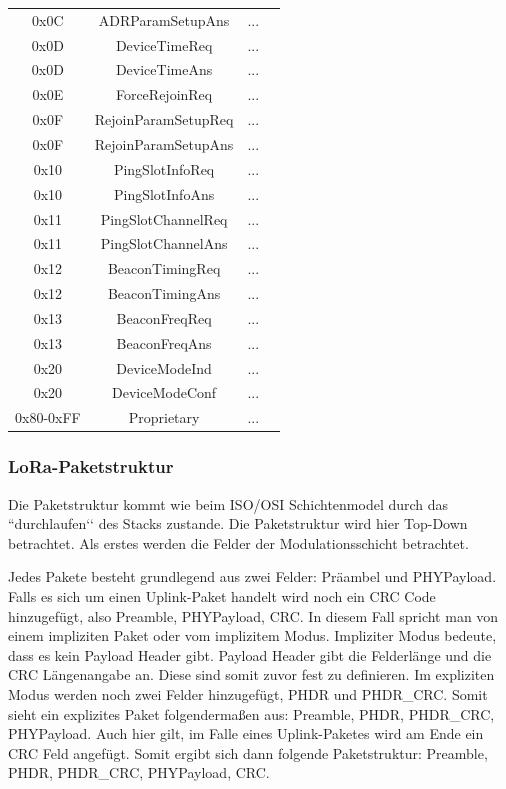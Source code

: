 \documentclass[a4paper, 12pt]{article}
\begin{document}
\begin{longtable}{c |c | p{10.5cm} c}
                    0x0C & ADRParamSetupAns & ... \\
                    0x0D & DeviceTimeReq & ... \\
                    0x0D & DeviceTimeAns & ... \\
                    0x0E & ForceRejoinReq & ... \\
                    0x0F & RejoinParamSetupReq & ... \\
                    0x0F & RejoinParamSetupAns & ... \\
                    0x10 & PingSlotInfoReq & ... \\
                    0x10 & PingSlotInfoAns & ... \\
                    0x11 & PingSlotChannelReq & ... \\
                    0x11 & PingSlotChannelAns & ... \\
                    0x12 & BeaconTimingReq & ... \\
                    0x12 & BeaconTimingAns & ... \\
                    0x13 & BeaconFreqReq & ... \\
                    0x13 & BeaconFreqAns & ... \\
                    0x20 & DeviceModeInd & ... \\
                    0x20 & DeviceModeConf & ... \\
                    0x80-0xFF & Proprietary & ... \\
                    
                    
                \end{longtable}
                


            \subsubsection{LoRa-Paketstruktur}
                Die Paketstruktur kommt wie beim ISO/OSI Schichtenmodel durch das ``durchlaufen‘‘ des Stacks zustande. 
                Die Paketstruktur wird hier Top-Down betrachtet. Als erstes werden die Felder
                der Modulationsschicht betrachtet.

                Jedes Pakete besteht grundlegend aus zwei Felder: Präambel und PHYPayload. Falls es sich um einen 
                Uplink-Paket handelt wird noch ein CRC Code hinzugefügt, also Preamble, PHYPayload, CRC. 
                In diesem Fall spricht man von einem impliziten Paket oder vom implizitem Modus. Impliziter Modus bedeute, 
                dass es kein Payload Header gibt. Payload Header gibt die Felderlänge und die CRC Längenangabe an. 
                Diese sind somit zuvor fest zu definieren. Im expliziten Modus werden noch zwei Felder hinzugefügt, 
                PHDR und PHDR\_CRC. Somit sieht ein explizites Paket folgendermaßen aus: Preamble, PHDR, PHDR\_CRC, 
                PHYPayload. Auch hier gilt, im Falle
                eines Uplink-Paketes wird am Ende ein CRC Feld angefügt. Somit ergibt sich dann folgende Paketstruktur: 
                Preamble, PHDR, PHDR\_CRC, PHYPayload, CRC.
\end{document}
